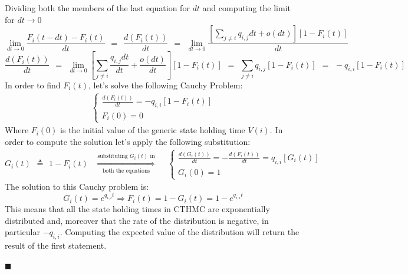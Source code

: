 \documentclass[12pt,a4paper]{article}
\begin{document}
Dividing both the members of the last equation for $dt$ and computing the limit for $dt\rightarrow 0$
$$
\lim_{dt\rightarrow 0}{\frac{F_i(t-dt)-F_i(t)}{dt}}
\hspace{5pt}=\hspace{5pt}
\frac{d\left(F_i(t)\right)}{dt}
\hspace{5pt}=\hspace{5pt}
\lim_{dt\rightarrow 0}\frac{
\left[
\sum_{j\neq i}{q_{i,j}dt+o(dt)}
\right]
\left[
1-F_i(t)
\right]}{dt}
$$ 
$$
\frac{d\left(F_i(t)\right)}{dt}
\hspace{5pt}=\hspace{5pt}
\lim_{dt\rightarrow 0}{
\left[
\sum_{j\neq i}{\frac{q_{i,j}dt}{dt}+\frac{o(dt)}{dt}}
\right]
\left[
1-F_i(t)
\right]}
\hspace{5pt}=\hspace{5pt}
\sum_{j\neq i}{q_{i,j}}
\left[
1-F_i(t)
\right]
\hspace{5pt}=\hspace{5pt}
-q_{i,i}
\left[
1-F_i(t)
\right]
$$
\newpage
\noindent
In order to find $F_i(t)$, let's solve the following Cauchy Problem:
$$
\begin{matrix}
\begin{cases}
\frac{d\left(F_i(t)\right)}{dt}=-q_{i,i}\left[1-F_i(t)\right]\\
F_i(0)=0
\end{cases}
\end{matrix}
$$
Where $F_i(0)$ is the initial value of the generic state holding time $V(i)$. In order to compute the solution let's apply the following substitution:
$$
G_i(t)\hspace{5pt}\triangleq\hspace{5pt} 1-F_i(t)
\hspace{10pt}
\overset{\textrm{substituting }G_i(t) \textrm{ in}}
{\underset{\textrm{both the equations}}{\Rightarrow}}
\hspace{10pt}
\begin{matrix}
\begin{cases}
\frac{d\left(G_i(t)\right)}{dt}=-\frac{d\left(F_i(t)\right)}{dt}=q_{i,i}\left[G_i(t)\right]\\
G_i(0)=1
\end{cases}
\end{matrix}
$$
The solution to this Cauchy problem is:
$$
G_i(t)=e^{q_{i,i}t}
\Rightarrow
F_i(t)=1-G_i(t)=1-e^{q_{i,i}t}
$$
This means that all the state holding times in CTHMC are exponentially distributed and, moreover that the rate of the distribution is negative, in particular $-q_{i,i}$. Computing the expected value of the distribution will return the result of the first statement.
\begin{flushright}
$\blacksquare$
\end{flushright}
\end{document}
